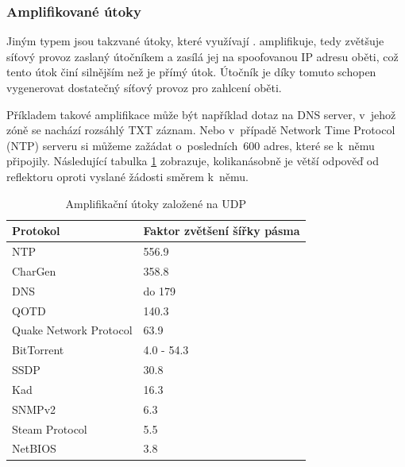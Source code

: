 \subsubsection{Amplifikované útoky}
Jiným typem jsou takzvané  útoky, které využívají .
 amplifikuje, tedy zvětšuje síťový provoz zaslaný útočníkem a zasílá jej na
spoofovanou IP adresu oběti, což tento útok činí silnějším než je přímý útok. Útočník je díky
tomuto schopen vygenerovat dostatečný síťový provoz pro zahlcení oběti.

Příkladem takové amplifikace může být například dotaz na DNS server, v~jehož zóně se nachází
rozsáhlý TXT záznam. Nebo v~případě Network Time Protocol (NTP) serveru si můžeme zažádat o~posledních~600
adres, které se k~němu připojily. Následující tabulka \ref{tab:udp_ampl} zobrazuje,
kolikanásobně je větší odpověď od reflektoru oproti vyslané žádosti směrem k~němu.

\begin{table}[ht]
	\centering
	\caption{Amplifikační útoky založené na UDP \cite{TA14-017A}}
	\label{tab:udp_ampl}
	\begin{tabular}{|l|l|}
		\hline
		Protokol               & Faktor zvětšení šířky pásma    \\ \hline
		NTP                    & 556.9                          \\ \hline
		CharGen                & 358.8                          \\ \hline
		DNS                    & do 179                         \\ \hline
		QOTD                   & 140.3                          \\ \hline
		Quake Network Protocol & 63.9                           \\ \hline
		BitTorrent             & 4.0 - 54.3                     \\ \hline
		SSDP                   & 30.8                           \\ \hline
		Kad                    & 16.3                           \\ \hline
		SNMPv2                 & 6.3                            \\ \hline
		Steam Protocol         & 5.5                            \\ \hline
		NetBIOS                & 3.8                            \\ \hline
	\end{tabular}
\end{table}

